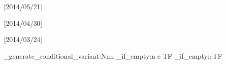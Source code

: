 \ifxetexorluatex
    \ifpresentation
        \providecommand*\autodot{} %
    \fi
    \usepackage{polyglossia}[2014/05/21]        %
\else
    \usepackage{cmap}   %
    \usepackage{textcomp}
    \usepackage[T1,T2A]{fontenc}                    %
    \usepackage[utf8]{inputenc}[2014/04/30]         %
    \usepackage[english, russian]{babel}[2014/03/24]%
    \makeatletter\AtBeginDocument{\let\@elt\relax}\makeatother %
\fi

\ifpresentation
\else
    \indentafterchapter     %
    \usepackage{indentfirst}
\fi

\ifpresentation
\else
    \usepackage[dvipsnames, table, hyperref]{xcolor} %
\fi

\usepackage{longtable} %
\usepackage{multirow,makecell}   %
\usepackage{tabulary,tabularray} %
\ExplSyntaxOn%
\prg_generate_conditional_variant:Nnn \tl_if_empty:n { e } { TF }
\let \IfTokenListEmpty = \tl_if_empty:eTF
\ExplSyntaxOff

